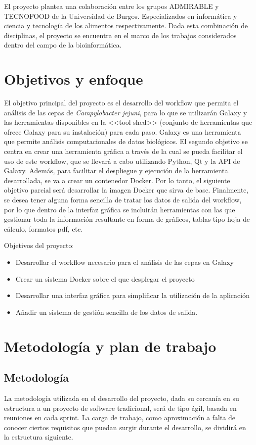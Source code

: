 El proyecto plantea una colaboración entre los grupos ADMIRABLE y TECNOFOOD de la Universidad de Burgos. Especializados en informática y ciencia y tecnología de los alimentos respectivamente. Dada esta combinación de disciplinas, el proyecto se encuentra en el marco de los trabajos considerados dentro del campo de la bioinformática.


\section{Objetivos y enfoque}
El objetivo principal del proyecto es el desarrollo del workflow que permita el análisis de las cepas de \textit{Campylobacter jejuni}, para lo que se utilizarán Galaxy y las herramientas disponibles en la <<tool shed>> (conjunto de herramientas que ofrece Galaxy para su instalación) para cada paso. Galaxy es una herramienta que permite análisis computacionales de datos biológicos. 
El segundo objetivo se centra en crear una herramienta gráfica a través de la cual se pueda facilitar el uso de este workflow, que se llevará a cabo utilizando Python, Qt y la API de Galaxy. 
Además, para facilitar el despliegue y ejecución de la herramienta desarrollada, se va a crear un contenedor Docker. Por lo tanto, el siguiente objetivo parcial será desarrollar la imagen Docker que sirva de base.
Finalmente, se desea tener alguna forma sencilla de tratar los datos de salida del workflow, por lo que dentro de la interfaz gráfica se incluirán herramientas con las que gestionar toda la información resultante en forma de gráficos, tablas tipo hoja de cálculo, formatos pdf, etc.

Objetivos del proyecto:
\begin{itemize}
\item Desarrollar el workflow necesario para el análisis de las cepas en Galaxy
\item Crear un sistema Docker sobre el que desplegar el proyecto
\item Desarrollar una interfaz gráfica para simplificar la utilización de la aplicación
\item Añadir un sistema de gestión sencilla de los datos de salida.
\end{itemize}


\section{Metodología y plan de trabajo}
\subsection{Metodología}
La metodología utilizada en el desarrollo del proyecto, dada su cercanía en su estructura a un proyecto de software tradicional, será de tipo ágil, basada en reuniones en cada sprint.
La carga de trabajo, como aproximación a falta de conocer ciertos requisitos que puedan surgir durante el desarrollo, se dividirá en la estructura siguiente.

